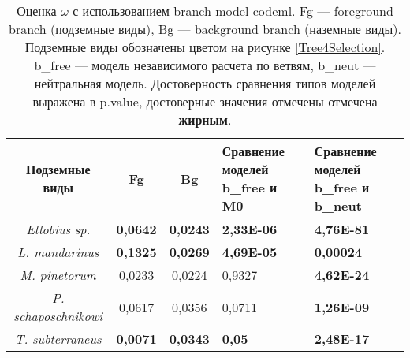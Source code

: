 \begin{table}[h!]
	\caption{Оценка $\omega$ с использованием branch model codeml. Fg --- foreground branch (подземные виды), Bg --- background branch (наземные виды). Подземные виды обозначены цветом на рисунке \ref{Tree4Selection}. b\_free --- модель независимого расчета по ветвям, b\_neut --- нейтральная модель. Достоверность сравнения типов моделей выражена в p.value, достоверные значения отмечены отмечена \textbf{жирным}.}\label{PAMLtable}
	\vspace{5mm}
	
\begin{center}
\begin{tabular}{|c|c|c|p{4.5cm}|p{4.5cm}|}
	\hline 
\textbf{Подземные виды} & \textbf{Fg} & \textbf{Bg} & \textbf{Сравнение моделей b\_free и M0} & \textbf{Сравнение моделей b\_free и b\_neut}\\ \hline
\textit{Ellobius sp.} & \textbf{0,0642} & \textbf{0,0243} & \textbf{2,33E-06} & \textbf{4,76E-81}\\ \hline
\textit{L. mandarinus} & \textbf{0,1325} & \textbf{0,0269} & \textbf{4,69E-05} & \textbf{0,00024}\\ \hline
\textit{M. pinetorum} & 0,0233 & 0,0224 & 0,9327 & \textbf{4,62E-24}\\ \hline
\textit{P. schaposchnikowi} & 0,0617 & 0,0356 & 0,0711 & \textbf{1,26E-09}\\ \hline
\textit{T. subterraneus} & \textbf{0,0071} & \textbf{0,0343} & \textbf{0,05} & \textbf{2,48E-17}\\ \hline
\end{tabular} 
\end{center}
\end{table}

\clearpage

